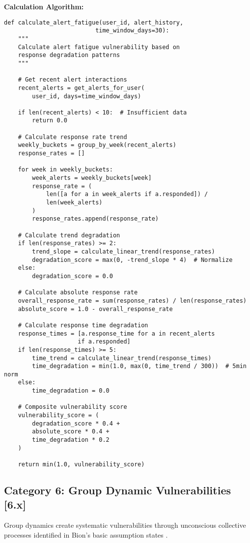 \documentclass[10pt,twocolumn]{IEEEtran}
\begin{document}
\textbf{Calculation Algorithm:}
\begin{lstlisting}[caption={Alert Fatigue Vulnerability}]
def calculate_alert_fatigue(user_id, alert_history, 
                          time_window_days=30):
    """
    Calculate alert fatigue vulnerability based on 
    response degradation patterns
    """
    
    # Get recent alert interactions
    recent_alerts = get_alerts_for_user(
        user_id, days=time_window_days)
    
    if len(recent_alerts) < 10:  # Insufficient data
        return 0.0
    
    # Calculate response rate trend
    weekly_buckets = group_by_week(recent_alerts)
    response_rates = []
    
    for week in weekly_buckets:
        week_alerts = weekly_buckets[week]
        response_rate = (
            len([a for a in week_alerts if a.responded]) / 
            len(week_alerts)
        )
        response_rates.append(response_rate)
    
    # Calculate trend degradation
    if len(response_rates) >= 2:
        trend_slope = calculate_linear_trend(response_rates)
        degradation_score = max(0, -trend_slope * 4)  # Normalize
    else:
        degradation_score = 0.0
    
    # Calculate absolute response rate
    overall_response_rate = sum(response_rates) / len(response_rates)
    absolute_score = 1.0 - overall_response_rate
    
    # Calculate response time degradation
    response_times = [a.response_time for a in recent_alerts 
                     if a.responded]
    if len(response_times) >= 5:
        time_trend = calculate_linear_trend(response_times)
        time_degradation = min(1.0, max(0, time_trend / 300))  # 5min norm
    else:
        time_degradation = 0.0
    
    # Composite vulnerability score
    vulnerability_score = (
        degradation_score * 0.4 +
        absolute_score * 0.4 +
        time_degradation * 0.2
    )
    
    return min(1.0, vulnerability_score)
\end{lstlisting}

\subsection{Category 6: Group Dynamic Vulnerabilities [6.x]}

Group dynamics create systematic vulnerabilities through unconscious collective processes identified in Bion's basic assumption states \cite{bion1961}.
\end{document}
